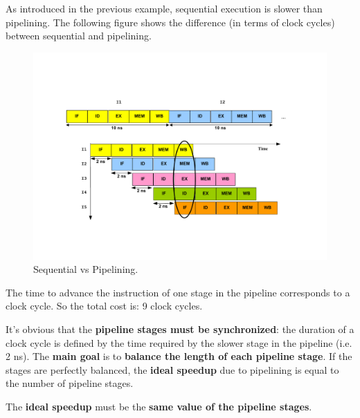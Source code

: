 \documentclass[a4paper]{article}
\newcommand{\definition}[1]{\textcolor{Red3}{\textbf{#1}}\index{#1}}
\newcommand{\highspace}{\vspace{1.2em}\noindent}
\begin{document}
    \noindent
    As introduced in the previous example, sequential execution is slower than pipelining. The following figure shows the difference (in terms of clock cycles) between sequential and pipelining.
    \begin{figure}[!htp]
        \centering
        \includegraphics[width=\textwidth]{img/sequential-vs-pipelining-1.pdf}
        \caption{Sequential vs Pipelining.\cite{pipelining-slides}}
        \label{fig: sequential vs pipelining}
    \end{figure}
    
    \newpage

    \noindent
    The time to advance the instruction of one stage in the pipeline corresponds to a clock cycle. So the total cost is: 9 clock cycles.

    \highspace
    It's obvious that the \textbf{pipeline stages must be synchronized}: the duration of a clock cycle is defined by the time required by the slower stage in the pipeline (i.e. 2 ns). The \textbf{main goal} is to \textbf{balance the length of each pipeline stage}. If the stages are perfectly balanced, the \textbf{ideal speedup} due to pipelining is equal to the number of pipeline stages.

    \begin{definitionbox}
        The \definition{ideal speedup} must be the \textbf{same value of the pipeline stages}.
    \end{definitionbox}
\end{document}
